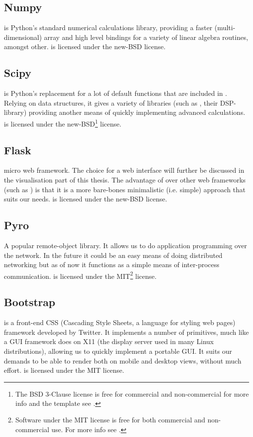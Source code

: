 \documentclass[a4paper, openany, oneside]{memoir}
\begin{document}
\subsection{Numpy}
\label{sec:numpy}
 is Python's standard numerical calculations library, providing a faster (multi-dimensional) array and high level bindings for a variety of linear algebra routines, amongst other.  is licensed under the new-BSD license.

\subsection{Scipy}
\label{sec:scipy}
 is Python's replacement for a lot of default functions that are included in \matlab{}. Relying on  data structures, it gives a variety of libraries (such as , their DSP-library) providing another means of quickly implementing advanced calculations.  is licensed under the new-BSD\footnote{\label{fn:bsd}The BSD 3-Clause license is free for commercial and non-commercial for more info and the template see \cite{bsdlic}.} license.

\subsection{Flask}
\label{sec:flask}
 micro web framework. The choice for a web interface will further be discussed in the visualisation part of this thesis. The advantage of  over other web frameworks (such as ) is that it is a more bare-bones minimalistic (i.e. simple) approach that suits our needs.  is licensed under the new-BSD license.

\subsection{Pyro}
\label{sec:pyro}
A popular remote-object library. It allows us to do application programming over the network. In the future it could be an easy means of doing distributed networking but as of now it functions as a simple means of inter-process communication.  is licensed under the MIT\footnote{\label{fn:mit}Software under the MIT license is free for both commercial and non-commercial use. For more info see \cite{mitlic}.} license.

\subsection{Bootstrap}
\label{sec:bootstrap}
 is a front-end CSS (Cascading Style Sheets, a language for styling web pages) framework developed by Twitter. It implements a number of primitives, much like a GUI framework does on X11 (the display server used in many Linux distributions), allowing us to quickly implement a portable GUI. It suits our demands to be able to render both on mobile and desktop views, without much effort.  is licensed under the MIT license.
\end{document}
